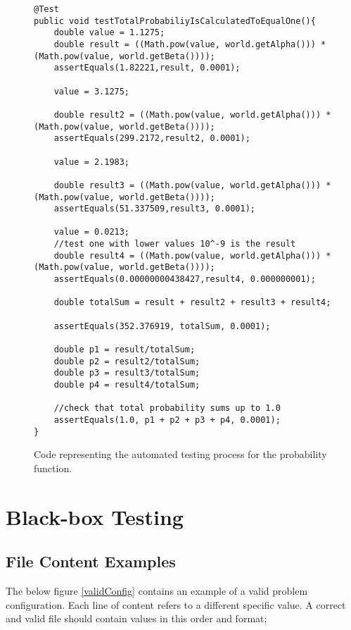 \begin{figure}[H]
\begin{lstlisting}
@Test
public void testTotalProbabiliyIsCalculatedToEqualOne(){
	double value = 1.1275;
	double result = ((Math.pow(value, world.getAlpha())) * (Math.pow(value, world.getBeta())));
	assertEquals(1.82221,result, 0.0001);

	value = 3.1275;

	double result2 = ((Math.pow(value, world.getAlpha())) * (Math.pow(value, world.getBeta())));
	assertEquals(299.2172,result2, 0.0001);

	value = 2.1983;

	double result3 = ((Math.pow(value, world.getAlpha())) * (Math.pow(value, world.getBeta())));
	assertEquals(51.337509,result3, 0.0001);

	value = 0.0213;
	//test one with lower values 10^-9 is the result
	double result4 = ((Math.pow(value, world.getAlpha())) * (Math.pow(value, world.getBeta())));
	assertEquals(0.00000000438427,result4, 0.000000001);

	double totalSum = result + result2 + result3 + result4;

	assertEquals(352.376919, totalSum, 0.0001);

	double p1 = result/totalSum;
	double p2 = result2/totalSum;
	double p3 = result3/totalSum;
	double p4 = result4/totalSum;

	//check that total probability sums up to 1.0
	assertEquals(1.0, p1 + p2 + p3 + p4, 0.0001);
}
\end{lstlisting}
\caption[Probability Test Code]{Code representing the automated testing process for the probability function.}
\label{testProb}
\end{figure}

\section{Black-box Testing}
\subsection{File Content Examples}
\label{fileIOtest}

The below figure \ref{validConfig} contains an example of a valid problem configuration. Each line of content refers to a different specific value. A correct and valid file should contain values in this order and format;

